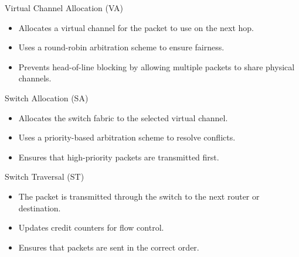 \documentclass{beamer}
\begin{document}
\begin{frame}{Virtual Channel Allocation (VA)}
	\begin{itemize}
		\item Allocates a virtual channel for the packet to use on the next hop.
		\item Uses a round-robin arbitration scheme to ensure fairness.
		\item Prevents head-of-line blocking by allowing multiple packets to share physical channels.
	\end{itemize}
\end{frame}

\begin{frame}{Switch Allocation (SA)}
	\begin{itemize}
		\item Allocates the switch fabric to the selected virtual channel.
		\item Uses a priority-based arbitration scheme to resolve conflicts.
		\item Ensures that high-priority packets are transmitted first.
	\end{itemize}
\end{frame}

\begin{frame}{Switch Traversal (ST)}
	\begin{itemize}
		\item The packet is transmitted through the switch to the next router or destination.
		\item Updates credit counters for flow control.
		\item Ensures that packets are sent in the correct order.
	\end{itemize}
\end{frame}
\end{document}
